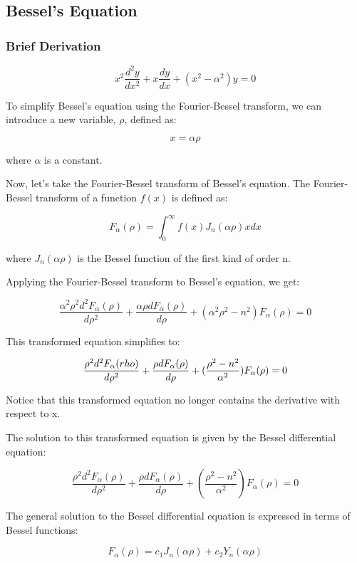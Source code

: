\subsection{Bessel's Equation}

\subsubsection{Brief Derivation}
\begin{equation}
    x^2 \frac{d^2 y}{dx^2} + x \frac{dy}{dx} + (x^2 - \alpha^2)y = 0
\end{equation}

To simplify Bessel's equation using the Fourier-Bessel transform, we can introduce a new variable, \(\rho\), defined as:

\[ x = \alpha \rho \]

where \(\alpha\) is a constant.

Now, let's take the Fourier-Bessel transform of Bessel's equation. The Fourier-Bessel transform of a function \(f(x)\) is defined as:

\[ F_\alpha(\rho) = \int_{0}^{\infty} f(x) J_n(\alpha\rho) x dx \]

where \(J_n(\alpha\rho)\) is the Bessel function of the first kind of order n.

Applying the Fourier-Bessel transform to Bessel's equation, we get:

\[ \frac{\alpha^2 \rho^2 d^2F_\alpha(\rho)}{d\rho^2} + \frac{\alpha\rho dF_\alpha(\rho)}{d\rho} + (\alpha^2 \rho^2 - n^2) F_\alpha(\rho) = 0 \]

This transformed equation simplifies to:

\[ \frac{\rho^2 d^2F_\alpha(\/rho)}{d\rho^2} + \frac{\rho dF_\alpha(\rho)}{d\rho} + (\frac{\rho^2 - n^2}{\alpha^2}) F_\alpha(\rho) = 0 \]

Notice that this transformed equation no longer contains the derivative with respect to x.

The solution to this transformed equation is given by the Bessel differential equation:

\[ \frac{\rho^2 d^2F_\alpha(\rho)}{d\rho^2} + \frac{\rho dF_\alpha(\rho)}{d\rho} + (\frac{\rho^2 - n^2}{\alpha^2}) F_\alpha(\rho) = 0 \]

The general solution to the Bessel differential equation is expressed in terms of Bessel functions:

\[ F_\alpha(\rho) = c_1 J_n(\alpha\rho) + c_2 Y_n(\alpha\rho) \]

